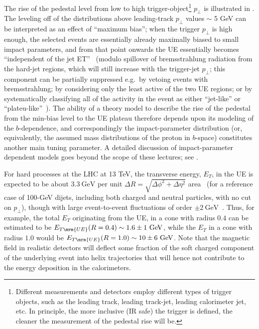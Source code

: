 The rise of the pedestal level from low to high trigger-object\footnote{Different measurements and detectors employ different types of trigger objects, such as the leading track, leading track-jet, leading calorimeter jet, etc. In principle, the more inclusive (IR safe) the trigger is defined, the cleaner the measurement of the pedestal rise will be.} $p_\perp$ is illustrated in . The leveling off of the distributions above leading-track $p_\perp$ values $\sim$ 5 GeV can be interpreted as an effect of ``maximum bias''; when the trigger $p_\perp$ is high enough, the selected events are essentially already maximally biased to small impact parameters, and from that point onwards the UE essentially becomes ``independent of the jet ET''~\cite{Arnison:1983gw} (modulo spillover of bremsstrahlung radiation from the hard-jet regions, which will still increase with the trigger-jet $p_\perp$; this component can be partially suppressed e.g.\ by vetoing events with bremsstrahlung; by considering only the least active of the two UE regions; or by systematically classifying all of the activity in the event as either ``jet-like'' or ``plateu-like''~\cite{Cacciari:2009dp}).
The ability of a theory model to describe the rise of the pedestal from the min-bias level to the UE plateau therefore depends upon its modeling of the $b$-dependence, and correspondingly the impact-parameter distribution (or, equivalently, the assumed mass distributions of the proton in $b$-space)
constitutes another main tuning parameter.   
%
A detailed discussion of impact-parameter dependent models goes beyond
the scope of these lectures;  
see \cite{Sjostrand:1987su,Sjostrand:2004pf,oai:arXiv.org:1101.5953}.  

For hard processes at the LHC at 13 TeV, the transverse energy, $E_T$, in the
UE is expected to be about $3.3~\mbox{GeV}$ per unit $\Delta
R=\sqrt{\Delta\phi^2+\Delta\eta^2}$ 
area~\cite{Skands:2013asa} (for a reference case of 100-GeV dijets, 
including both charged and neutral particles, with no cut on $p_\perp$), 
though with large event-to-event fluctuations of order $\pm
2~\mbox{GeV}$~\cite{Aad:2010fh}. Thus, for example, the total $E_T$
originating from the UE,  
in a cone with radius $0.4$ can be estimated to
be $E_{T\mrm{UE}}(R=0.4)\sim 1.6\pm 1~\mbox{GeV}$, 
while the $E_T$ in a cone with radius $1.0$ would be
$E_{T\mrm{UE}}(R=1.0)\sim 10\pm 6~\mbox{GeV}$. Note that the magnetic
field in realistic detectors will deflect some fraction of the soft charged
component of the underlying event into helix trajectories that will
hence not contribute to the energy deposition in the
calorimeters. 

